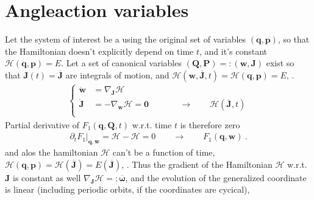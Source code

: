 \documentclass[letterpaper,10pt,english]{jupyterBook}
\begin{document}
\section{Angle\sphinxhyphen{}action variables}
\label{\detokenize{ch/quantum-mechanics/analytical-mechanics:angle-action-variables}}\label{\detokenize{ch/quantum-mechanics/analytical-mechanics:quantum-mechanics-analytical-mechanics-angle-action}}
\sphinxAtStartPar
Let the system of interest be a  using the original set of variables \((\mathbf{q}, \mathbf{p})\), so that the Hamiltonian doesn’t explicitly depend on time \(t\), and it’s constant \(\mathcal{H}(\mathbf{q}, \mathbf{p}) = E\).
Let a set of canonical variables \((\mathbf{Q}, \mathbf{P}) =: (\mathbf{w}, \mathbf{J})\) exist so that \(\mathbf{J}(t) = \overline{\mathbf{J}}\) are integrals of motion, and \(\mathscr{H}(\mathbf{w}, \overline{\mathbf{J}}, t) = \mathcal{H}(\mathbf{q}, \mathbf{p}) = E\), .
\begin{equation*}
\begin{split}\left\{
\begin{aligned}
  \dot{\mathbf{w}} & = \nabla_{\mathbf{J}} \mathscr{H} \\
  \dot{\mathbf{J}} & =-\nabla_{\mathbf{w}} \mathscr{H} = \mathbf{0} && \qquad \rightarrow \qquad \mathscr{H}(\mathbf{\overline{J}}, t) \\
\end{aligned}
\right.\end{split}
\end{equation*}
\sphinxAtStartPar
Partial derivative of \(F_1(\mathbf{q}, \mathbf{Q}, t)\) w.r.t. time \(t\) is therefore zero
\begin{equation*}
\begin{split}\partial_t F_1|_{\mathbf{q}, \mathbf{w}} = \mathscr{H} - \mathcal{H} = 0 \qquad \rightarrow \qquad F_1(\mathbf{q}, \mathbf{w}) \ .\end{split}
\end{equation*}
\sphinxAtStartPar
and alos the hamiltonian \(\mathscr{H}\) can’t be a function of time, \(\mathcal{H}(\mathbf{q}, \mathbf{p}) = \mathscr{H}(\overline{\mathbf{J}}) = E(\overline{\mathbf{J}})\), . Thus the gradient of the Hamiltonian \(\mathscr{H}\) w.r.t. \(\mathbf{J}\) is constant as well \(\nabla_{\mathbf{J}} \mathscr{H} =: \overline{\boldsymbol\omega}\), and the evolution of the generalized coordinate is linear (including periodic orbits, if the coordinates are cycical),
\end{document}
